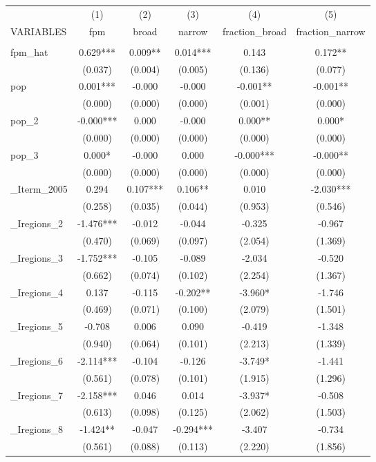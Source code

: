 \documentclass[]{article}
\begin{document}
\begin{tabular}{lccccc} \hline
 & (1) & (2) & (3) & (4) & (5) \\
VARIABLES & fpm & broad & narrow & fraction\_broad & fraction\_narrow \\ \hline
 &  &  &  &  &  \\
fpm\_hat & 0.629*** & 0.009** & 0.014*** & 0.143 & 0.172** \\
 & (0.037) & (0.004) & (0.005) & (0.136) & (0.077) \\
pop & 0.001*** & -0.000 & -0.000 & -0.001** & -0.001** \\
 & (0.000) & (0.000) & (0.000) & (0.001) & (0.000) \\
pop\_2 & -0.000*** & 0.000 & -0.000 & 0.000** & 0.000* \\
 & (0.000) & (0.000) & (0.000) & (0.000) & (0.000) \\
pop\_3 & 0.000* & -0.000 & 0.000 & -0.000*** & -0.000** \\
 & (0.000) & (0.000) & (0.000) & (0.000) & (0.000) \\
\_Iterm\_2005 & 0.294 & 0.107*** & 0.106** & 0.010 & -2.030*** \\
 & (0.258) & (0.035) & (0.044) & (0.953) & (0.546) \\
\_Iregions\_2 & -1.476*** & -0.012 & -0.044 & -0.325 & -0.967 \\
 & (0.470) & (0.069) & (0.097) & (2.054) & (1.369) \\
\_Iregions\_3 & -1.752*** & -0.105 & -0.089 & -2.034 & -0.520 \\
 & (0.662) & (0.074) & (0.102) & (2.254) & (1.367) \\
\_Iregions\_4 & 0.137 & -0.115 & -0.202** & -3.960* & -1.746 \\
 & (0.469) & (0.071) & (0.100) & (2.079) & (1.501) \\
\_Iregions\_5 & -0.708 & 0.006 & 0.090 & -0.419 & -1.348 \\
 & (0.940) & (0.064) & (0.101) & (2.213) & (1.339) \\
\_Iregions\_6 & -2.114*** & -0.104 & -0.126 & -3.749* & -1.441 \\
 & (0.561) & (0.078) & (0.101) & (1.915) & (1.296) \\
\_Iregions\_7 & -2.158*** & 0.046 & 0.014 & -3.937* & -0.508 \\
 & (0.613) & (0.098) & (0.125) & (2.062) & (1.503) \\
\_Iregions\_8 & -1.424** & -0.047 & -0.294*** & -3.407 & -0.734 \\
 & (0.561) & (0.088) & (0.113) & (2.220) & (1.856) \\

\end{tabular}
\end{document}
